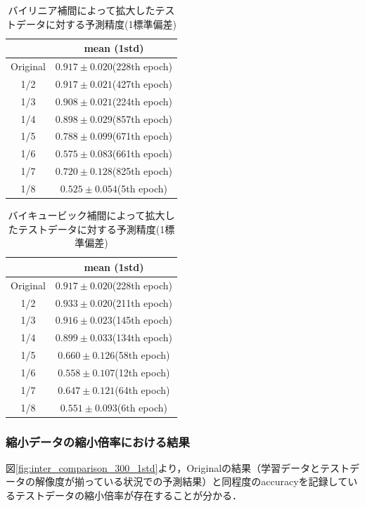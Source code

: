 \documentclass[a4j, 11pt]{jreport}
\begin{document}
\begin{table}[H]
  \centering
	\caption{バイリニア補間によって拡大したテストデータに対する予測精度(1標準偏差)}
  \begin{tabular}{|c|c|}
		\hline
    & mean (1std) \\ \hline
    Original & $0.917 \pm 0.020$(228th epoch) \\ \hline
    1/2 & $0.917 \pm 0.021$(427th epoch) \\ \hline
    1/3 & $0.908 \pm 0.021$(224th epoch) \\ \hline
    1/4 & $0.898 \pm 0.029$(857th epoch) \\ \hline
    1/5 & $0.788 \pm 0.099$(671th epoch) \\ \hline
    1/6 & $0.575 \pm 0.083$(661th epoch) \\ \hline
    1/7 & $0.720 \pm 0.128$(825th epoch) \\ \hline
    1/8 & $0.525 \pm 0.054$(5th epoch) \\ \hline
  \end{tabular}
  \label{tb:accs_4_2_linear_1std}
\end{table}

\begin{table}[H]
  \centering
	\caption{バイキュービック補間によって拡大したテストデータに対する予測精度(1標準偏差)}
  \begin{tabular}{|c|c|}
		\hline
    & mean (1std) \\ \hline
    Original & $0.917 \pm 0.020$(228th epoch) \\ \hline
    1/2 & $0.933 \pm 0.020$(211th epoch) \\ \hline
    1/3 & $0.916 \pm 0.023$(145th epoch) \\ \hline
    1/4 & $0.899 \pm 0.033$(134th epoch) \\ \hline
    1/5 & $0.660 \pm 0.126$(58th epoch) \\ \hline
    1/6 & $0.558 \pm 0.107$(12th epoch) \\ \hline
    1/7 & $0.647 \pm 0.121$(64th epoch) \\ \hline
    1/8 & $0.551 \pm 0.093$(6th epoch) \\ \hline
  \end{tabular}
  \label{tb:accs_4_2_cubic_1std}
\end{table}

\subsubsection{縮小データの縮小倍率における結果}
図\ref{fig:inter_comparison_300_1std}より，Originalの結果（学習データとテストデータの解像度が揃っている状況での予測結果）と同程度のaccuracyを記録しているテストデータの縮小倍率が存在することが分かる．
\end{document}
